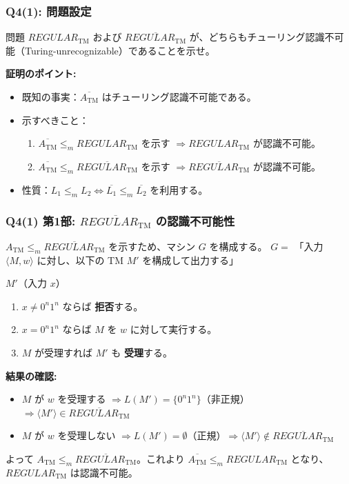 \begin{frame}[fragile]
\frametitle{Q4(1): 問題設定}

\begin{alertblock}{問題}
$REGULAR_{\text{TM}}$ および $\overline{REGULAR_{\text{TM}}}$ が、どちらもチューリング認識不可能（Turing-unrecognizable）であることを示せ。
\end{alertblock}

\textbf{証明のポイント:}
\begin{itemize}
    \item 既知の事実：$\overline{A_{\text{TM}}}$ はチューリング認識不可能である。
    \item 示すべきこと：
    \begin{enumerate}
        \item $\overline{A_{\text{TM}}} \le_{m} REGULAR_{\text{TM}}$ を示す $\Rightarrow REGULAR_{\text{TM}}$ が認識不可能。
        \item $\overline{A_{\text{TM}}} \le_{m} \overline{REGULAR_{\text{TM}}}$ を示す $\Rightarrow \overline{REGULAR_{\text{TM}}}$ が認識不可能。
    \end{enumerate}
    \item 性質：$L_1 \le_m L_2 \iff \overline{L_1} \le_m \overline{L_2}$ を利用する。
\end{itemize}
\end{frame}

\begin{frame}[fragile]
\frametitle{Q4(1) 第1部:  $\overline{REGULAR_{\text{TM}}}$  の認識不可能性}

$A_{\text{TM}} \le_m \overline{REGULAR_{\text{TM}}}$ を示すため、マシン $G$ を構成する。
$G = $ 「入力 $\langle M, w \rangle$ に対し、以下の TM $M'$ を構成して出力する」
\begin{block}{$M'$（入力 $x$）}
    \begin{enumerate}
        \item $x \neq 0^n 1^n$ ならば \textbf{拒否}する。
        \item $x = 0^n 1^n$ ならば $M$ を $w$ に対して実行する。
        \item $M$ が受理すれば $M'$ も \textbf{受理}する。
    \end{enumerate}
\end{block}

\textbf{結果の確認:}
\begin{itemize}
    \item $M$ が $w$ を受理する $\Rightarrow L(M') = \{0^n 1^n\}$（非正規）$\Rightarrow \langle M' \rangle \in \overline{REGULAR_{\text{TM}}}$
    \item $M$ が $w$ を受理しない $\Rightarrow L(M') = \emptyset$（正規）$\Rightarrow \langle M' \rangle \notin \overline{REGULAR_{\text{TM}}}$
\end{itemize}
よって $A_{\text{TM}} \le_m \overline{REGULAR_{\text{TM}}}$。これより $\overline{A_{\text{TM}}} \le_m REGULAR_{\text{TM}}$ となり、$REGULAR_{\text{TM}}$ は認識不可能。
\end{frame}

